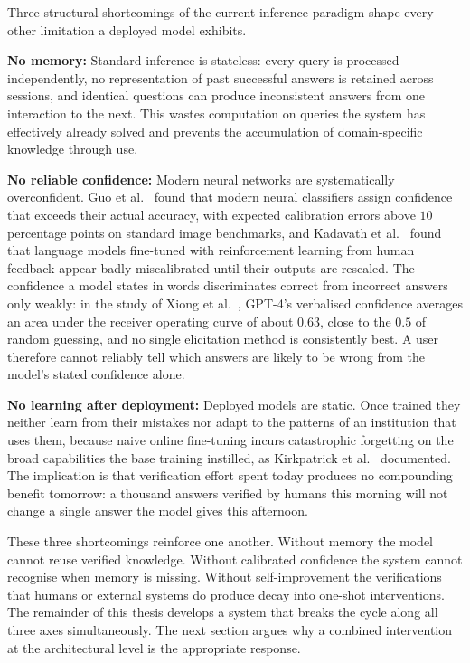 Three structural shortcomings of the current inference paradigm shape every other limitation a deployed model exhibits.

\textbf{No memory:} Standard inference is stateless: every query is processed independently, no representation of past successful answers is retained across sessions, and identical questions can produce inconsistent answers from one interaction to the next. This wastes computation on queries the system has effectively already solved and prevents the accumulation of domain-specific knowledge through use.

\textbf{No reliable confidence:} Modern neural networks are systematically overconfident. Guo et al.~\cite{pmlr-v70-guo17a} found that modern neural classifiers assign confidence that exceeds their actual accuracy, with expected calibration errors above $10$ percentage points on standard image benchmarks, and Kadavath et al.~\cite{kadavath2022language} found that language models fine-tuned with reinforcement learning from human feedback appear badly miscalibrated until their outputs are rescaled. The confidence a model states in words discriminates correct from incorrect answers only weakly: in the study of Xiong et al.~\cite{xiong2023can}, GPT-4's verbalised confidence averages an area under the receiver operating curve of about $0.63$, close to the $0.5$ of random guessing, and no single elicitation method is consistently best. A user therefore cannot reliably tell which answers are likely to be wrong from the model's stated confidence alone.

\textbf{No learning after deployment:} Deployed models are static. Once trained they neither learn from their mistakes nor adapt to the patterns of an institution that uses them, because naive online fine-tuning incurs catastrophic forgetting on the broad capabilities the base training instilled, as Kirkpatrick et al.~\cite{doi:10.1073/pnas.1611835114} documented. The implication is that verification effort spent today produces no compounding benefit tomorrow: a thousand answers verified by humans this morning will not change a single answer the model gives this afternoon.

These three shortcomings reinforce one another. Without memory the model cannot reuse verified knowledge. Without calibrated confidence the system cannot recognise when memory is missing. Without self-improvement the verifications that humans or external systems do produce decay into one-shot interventions. The remainder of this thesis develops a system that breaks the cycle along all three axes simultaneously. The next section argues why a combined intervention at the architectural level is the appropriate response.


